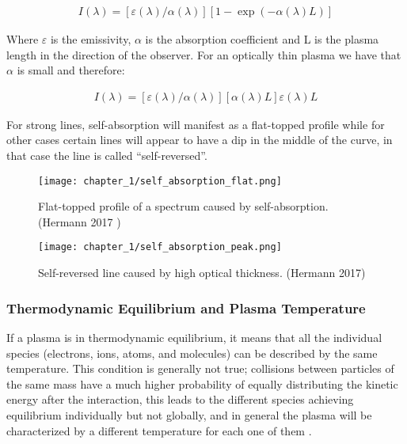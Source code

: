 \begin{align}
  I\left(\lambda\right)=\left[\varepsilon\left(\lambda\right)/\alpha\left(\lambda\right)\right]\left[1-\exp{\left(-\alpha\left(\lambda\right)L\right)}\right] \label{eq:intensity_radiation}  
\end{align}

Where $\varepsilon$ is the emissivity, $\alpha$ is the absorption coefficient and L is the plasma length in the direction of the observer. For an optically thin plasma we have that $\alpha$ is small and therefore:

\begin{align}
   I(\lambda)=[\varepsilon(\lambda)/\alpha(\lambda)][\alpha(\lambda)L]\varepsilon(\lambda)L \label{eq:intensity_radiation_approx}  
\end{align}

For strong lines, self-absorption will manifest as a flat-topped profile while for other cases certain lines will appear to have a dip in the middle of the curve, in that case the line is called “self-reversed”. 

\begin{figure}[H]
    \centering
    \texttt{[image: chapter\_1/self\_absorption\_flat.png]}
    \caption{Flat-topped profile of a spectrum caused by self-absorption. (Hermann 2017 \cite{hermannIdealRadiationSource2017})}
    \label{fig:self_absorbed_flat}
\end{figure}

\begin{figure}[H]
    \centering
    \texttt{[image: chapter\_1/self\_absorption\_peak.png]}
    \caption{Self-reversed line caused by high optical thickness. (Hermann 2017)}
    \label{fig:self_absorbed_peak}
\end{figure}

\subsubsection{Thermodynamic Equilibrium and Plasma Temperature}
\label{subsubsec:thermodynamic_eq}

If a plasma is in thermodynamic equilibrium, it means that all the individual species (electrons, ions, atoms, and molecules) can be described by the same temperature. This condition is generally not true; collisions between particles of the same mass have a much higher probability of equally distributing the kinetic energy after the interaction, this leads to the different species achieving equilibrium individually but not globally, and in general the plasma will be characterized by a different temperature for each one of them \cite{griemPrinciplesPlasmaSpectroscopy1997}.

